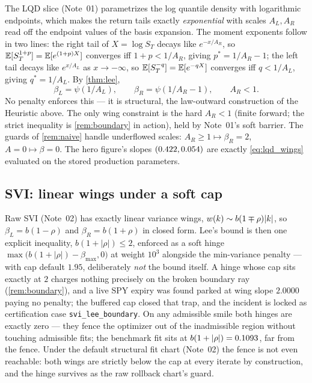 \documentclass[11pt]{article}
\newcommand{\bL}{\beta_L}
\newcommand{\bR}{\beta_R}
\newcommand{\AL}{A_L}
\newcommand{\AR}{A_R}
\begin{document}
The LQD slice (Note~01) parametrizes the log quantile density with
logarithmic endpoints, which makes the return tails exactly
\emph{exponential} with scales $\AL,\AR$ read off the endpoint values of
the basis expansion.  The moment exponents follow in two lines: the
right tail of $X=\log S_T$ decays like $e^{-x/\AR}$, so
$\mathbb{E}[S_T^{1+p}]=\mathbb{E}[e^{(1+p)X}]$ converges iff $1+p<1/\AR$, giving
$p^{*}=1/\AR-1$; the left tail decays like $e^{x/\AL}$ as
$x\to-\infty$, so $\mathbb{E}[S_T^{-q}]=\mathbb{E}[e^{-qX}]$ converges iff $q<1/\AL$,
giving $q^{*}=1/\AL$.  By \cref{thm:lee},
\begin{equation}
\bL=\psi(1/\AL),\qquad \bR=\psi(1/\AR-1),\qquad \AR<1 .
\label{eq:lqd_wings}
\end{equation}
No penalty enforces this --- it is structural, the law-outward
construction of the Heuristic above.  The only wing constraint is the
hard $\AR<1$ (finite forward; the strict inequality is
\cref{rem:boundary} in action), held by Note~01's soft barrier.  The
guards of \cref{rem:naive} handle underflowed scales:
$\AR\ge1\mapsto\bR=2$, $A=0\mapsto\beta=0$.  The hero figure's slopes
$(0.422,0.054)$ are exactly \eqref{eq:lqd_wings}
evaluated on the stored production parameters.

\subsection{SVI: linear wings under a soft cap}

Raw SVI (Note~02) has exactly linear variance wings,
$w(k)\sim b(1\mp\rho)|k|$, so $\bL=b(1-\rho)$ and $\bR=b(1+\rho)$
in closed form.  Lee's bound is then one explicit inequality,
$b(1+|\rho|)\le2$, enforced as a soft hinge
$\max\big(b(1+|\rho|)-\beta_{\max},0\big)$ at weight $10^{3}$ alongside
the min-variance penalty --- with cap default $1.95$, deliberately
\emph{not} the bound itself.  A hinge whose cap sits exactly at $2$
charges nothing precisely on the broken boundary ray
(\cref{rem:boundary}), and a live SPY expiry was found parked at wing
slope $2.0000$ paying no penalty; the buffered cap closed that trap, and
the incident is locked as certification case \texttt{svi\_lee\_boundary}.
On any admissible smile
both hinges are exactly zero --- they fence the optimizer out of the
inadmissible region without touching admissible fits; the benchmark fit
sits at $b(1+|\rho|)=0.1093$, far from the fence.  Under the default
structural fit chart (Note~02) the fence is not even reachable: both
wings are strictly below the cap at every iterate by construction, and
the hinge survives as the raw rollback chart's guard.
\end{document}

